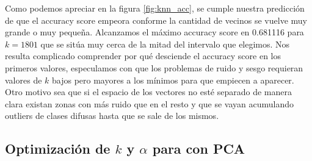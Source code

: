 Como podemos apreciar en la figura \ref{fig:knn_acc}, se cumple nuestra predicción de que el accuracy score empeora conforme la cantidad de vecinos se vuelve muy grande o muy pequeña. Alcanzamos el máximo accuracy score en 0.681116 para $k=1801$ que se sitúa muy cerca de la mitad del intervalo que elegimos. Nos resulta complicado comprender por qué desciende el accuracy score en los primeros valores, especulamos con que los problemas de ruido y sesgo requieran valores de $k$ bajos pero mayores a los mínimos para que empiecen a aparecer. Otro motivo sea que si el espacio de los vectores no esté separado de manera clara existan zonas con más ruido que en el resto y que se vayan acumulando outliers de clases difusas hasta que se sale de los mismos.

\subsection{Optimización de $k$ y $\alpha$ para \knn{} con PCA}%
\label{sub:alpha_k_knn_pca}

